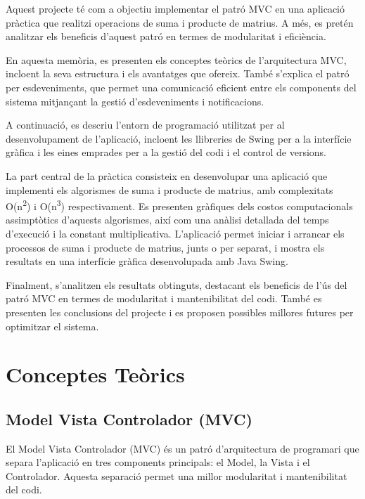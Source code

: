 \documentclass{ieeetj}
\begin{document}
Aquest projecte té com a objectiu implementar el patró MVC en una aplicació pràctica que realitzi operacions de suma i producte de matrius. A més, es pretén analitzar els beneficis d'aquest patró en termes de modularitat i eficiència.

En aquesta memòria, es presenten els conceptes teòrics de l'arquitectura MVC, incloent la seva estructura i els avantatges que ofereix. També s'explica el patró per esdeveniments, que permet una comunicació eficient entre els components del sistema mitjançant la gestió d'esdeveniments i notificacions.

A continuació, es descriu l'entorn de programació utilitzat per al desenvolupament de l'aplicació, incloent les llibreries de Swing per a la interfície gràfica i les eines emprades per a la gestió del codi i el control de versions.

La part central de la pràctica consisteix en desenvolupar una aplicació que implementi els algorismes de suma i producte de matrius, amb complexitats O(n\textsuperscript{2}) i O(n\textsuperscript{3}) respectivament. Es presenten gràfiques dels costos computacionals assimptòtics d'aquests algorismes, així com una anàlisi detallada del temps d'execució i la constant multiplicativa. L'aplicació permet iniciar i arrancar els processos de suma i producte de matrius, junts o per separat, i mostra els resultats en una interfície gràfica desenvolupada amb Java Swing.

Finalment, s'analitzen els resultats obtinguts, destacant els beneficis de l'ús del patró MVC en termes de modularitat i mantenibilitat del codi. També es presenten les conclusions del projecte i es proposen possibles millores futures per optimitzar el sistema.

\section{Conceptes Teòrics}
\subsection{Model Vista Controlador (MVC)}
El Model Vista Controlador (MVC) és un patró d'arquitectura de programari que separa l'aplicació en tres components principals: el Model, la Vista i el Controlador. Aquesta separació permet una millor modularitat i mantenibilitat del codi.
\end{document}
